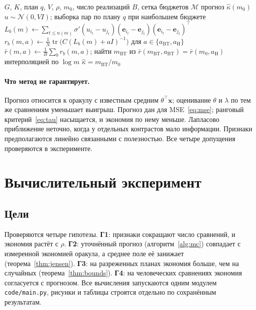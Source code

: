 \documentclass{article}
\theoremstyle{definition}
\theoremstyle{remark}
\newcommand{\tr}{\operatorname{tr}}
\newcommand{\bx}{\mathbf{x}}
\newcommand{\be}{\mathbf{e}}
\newcommand{\aBT}{a_{\mathrm{BT}}}
\newcommand{\aH}{a_{\mathrm{H}}}
\newcommand{\mBT}{m_{\mathrm{BT}}}
\begin{document}
\begin{algorithm}[h]
\caption{Априорный прогноз экономии методом Монте-Карло}\label{alg:mc}
\begin{algorithmic}[1]
\Require $G$, $K$, план $q$, $V$, $\rho$, $m_0$, число реализаций $B$, сетка бюджетов $\mathcal M$
\Ensure прогноз $\hat\kappa(m_0)$
	\State $u\sim\mathcal N(0,VI)$; выборка пар по плану $q$ при наибольшем бюджете
	 
		\State $L_b(m)\gets\sum_{t\le n(m)}\sigma'(u_{i_t}-u_{j_t})(\be_{i_t}-\be_{j_t})(\be_{i_t}-\be_{j_t})^{\top}$
		\State $r_b(m,a)\gets\frac1N\tr\bigl(C(L_b(m)+aI)^{-1}\bigr)$ для $a\in\{\aBT,\aH\}$
	\EndFor
\EndFor
\State $\bar r(m,a)\gets\frac1B\sum_b r_b(m,a)$; найти $\mBT$ из $\bar r(\mBT,\aBT)=\bar r(m_0,\aH)$ интерполяцией по $\log m$
\State \Return $\hat\kappa=\mBT/m_0$
\end{algorithmic}
\end{algorithm}

\paragraph{Что метод не гарантирует.}
Прогноз относится к оракулу с известным средним $\theta^{\top}\bx$; оценивание $\theta$ и $\lambda$ по тем же сравнениям уменьшает выигрыш. Прогноз дан для MSE~\eqref{eq:mse}; ранговый критерий~\eqref{eq:tau} насыщается, и экономия по нему меньше. Лапласово приближение неточно, когда у отдельных контрастов мало информации. Признаки предполагаются линейно связанными с полезностью. Все четыре допущения проверяются в эксперименте.

\section{Вычислительный эксперимент}
\label{sec:exp}

\subsection{Цели}
Проверяются четыре гипотезы. \textbf{Г1}: признаки сокращают число сравнений, и экономия растёт с $\rho$. \textbf{Г2}: уточнённый прогноз (алгоритм~\ref{alg:mc}) совпадает с измеренной экономией оракула, а среднее поле её занижает (теорема~\ref{thm:jensen}). \textbf{Г3}: на разреженных планах экономия больше, чем на случайных (теорема~\ref{thm:bounds}). \textbf{Г4}: на человеческих сравнениях экономия согласуется с прогнозом. Все вычисления запускаются одним модулем \texttt{code/main.py}, рисунки и таблицы строятся отдельно по сохранённым результатам.
\end{document}
